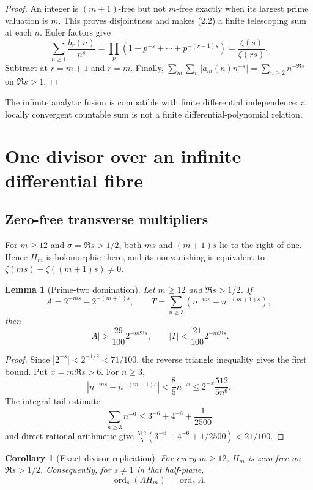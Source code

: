 \documentclass[11pt]{article}
\newtheorem{lemma}[theorem]{Lemma}
\newtheorem{corollary}[theorem]{Corollary}
\theoremstyle{definition}
\theoremstyle{remark}
\newcommand{\ord}{\operatorname{ord}}
\begin{document}
\begin{proof}
An integer is $(m+1)$-free but not $m$-free exactly when its largest prime valuation is $m$.
This proves disjointness and makes (2.2) a finite telescoping sum at each $n$.  Euler factors give
\[
 \sum_{n\geq1}\frac{b_r(n)}{n^s}
 =\prod_p(1+p^{-s}+\cdots+p^{-(r-1)s})
 =\frac{\zeta(s)}{\zeta(rs)}.
\]
Subtract at $r=m+1$ and $r=m$.  Finally,
$\sum_m\sum_n|a_m(n)n^{-s}|=\sum_{n\geq2}n^{-\Re s}$ on $\Re s>1$.
\end{proof}

The infinite analytic fusion is compatible with finite differential independence: a locally
convergent countable sum is not a finite differential-polynomial relation.

\section{One divisor over an infinite differential fibre}

\subsection{Zero-free transverse multipliers}

For $m\geq12$ and $\sigma=\Re s>1/2$, both $ms$ and $(m+1)s$ lie to the right of one.  Hence
$H_m$ is holomorphic there, and its nonvanishing is equivalent to
\(\zeta(ms)-\zeta((m+1)s)\ne0\).

\begin{lemma}[Prime-two domination]\label{lem:two}
Let $m\geq12$ and $\Re s>1/2$.  If
\[
 A=2^{-ms}-2^{-(m+1)s},\qquad
 T=\sum_{n\geq3}(n^{-ms}-n^{-(m+1)s}),
\]
then
\[
 |A|>\frac{29}{100}2^{-m\Re s},\qquad
 |T|<\frac{21}{100}2^{-m\Re s}.
\]
\end{lemma}

\begin{proof}
Since $|2^{-s}|<2^{-1/2}<71/100$, the reverse triangle inequality gives the first bound.  Put
$x=m\Re s>6$.  For $n\geq3$,
\[
 |n^{-ms}-n^{-(m+1)s}|<\frac85n^{-x}
 \leq 2^{-x}\frac{512}{5n^6}.
\]
The integral tail estimate
\[
 \sum_{n\geq3}n^{-6}
 \leq3^{-6}+4^{-6}+\frac1{2500}
\]
and direct rational arithmetic give
\(\frac{512}{5}(3^{-6}+4^{-6}+1/2500)<21/100\).
\end{proof}

\begin{corollary}[Exact divisor replication]\label{cor:divisor}
For every $m\geq12$, $H_m$ is zero-free on $\Re s>1/2$.  Consequently, for $s\ne1$ in that
half-plane,
\[
 \ord_s(\Lambda H_m)=\ord_s\Lambda.
 \tag{3.1}
\]
\end{corollary}
\end{document}
